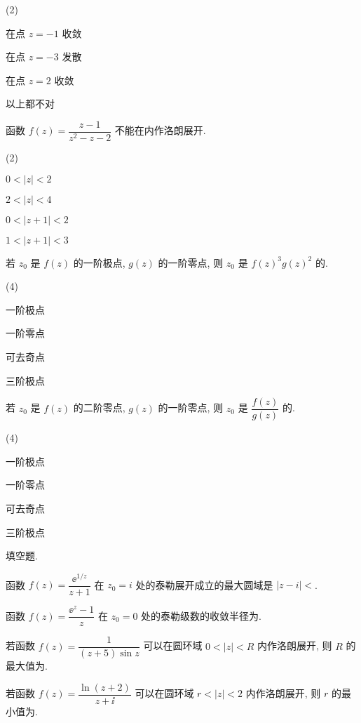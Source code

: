 \begin{homework}
\begin{subex}
      \begin{exchoice}(2)
        \item 在点 $z=-1$ 收敛
        \item 在点 $z=-3$ 发散
        \item 在点 $z=2$ 收敛
        \item 以上都不对
      \end{exchoice}
    \item 函数 $f(z)=\dfrac{z-1}{z^2-z-2}$ 不能在\fillbrace{}内作洛朗展开.
      \begin{exchoice}(2)
        \item $0<|z|<2$
        \item $2<|z|<4$
        \item $0<|z+1|<2$
        \item $1<|z+1|<3$
      \end{exchoice}
    \item 若 $z_0$ 是 $f(z)$ 的一阶极点, $g(z)$ 的一阶零点, 则 $z_0$ 是 $f(z)^3g(z)^2$ 的\fillbrace{}.
      \begin{exchoice}(4)
        \item 一阶极点
        \item 一阶零点
        \item 可去奇点
        \item 三阶极点
      \end{exchoice}
    \item 若 $z_0$ 是 $f(z)$ 的二阶零点, $g(z)$ 的一阶零点, 则 $z_0$ 是 $\dfrac{f(z)}{g(z)}$ 的\fillbrace{}.
      \begin{exchoice}(4)
        \item 一阶极点
        \item 一阶零点
        \item 可去奇点
        \item 三阶极点
      \end{exchoice}
  \end{subex}
  \item 填空题.
  \begin{subex}
    \item 函数 $f(z)=\dfrac{\ee^{1/z}}{z+1}$ 在 $z_0=i$ 处的泰勒展开成立的最大圆域是 $|z-i|<$\fillblank{}.
    \item 函数 $f(z)=\dfrac{\ee^z-1}{z}$ 在 $z_0=0$ 处的泰勒级数的收敛半径为\fillblank{}.
    \item 若函数 $f(z)=\dfrac1{(z+5)\sin z}$ 可以在圆环域 $0<|z|<R$ 内作洛朗展开, 则 $R$ 的最大值为\fillblank{}.
    \item 若函数 $f(z)=\dfrac{\ln(z+2)}{z+\ii}$ 可以在圆环域 $r<|z|<2$ 内作洛朗展开, 则 $r$ 的最小值为\fillblank{}.

\end{subex}
\end{homework}
